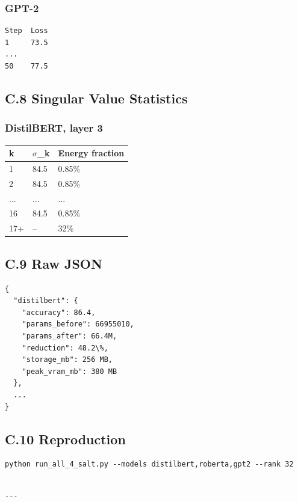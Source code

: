 \subsubsection{GPT-2}

\begin{lstlisting}
Step  Loss
1     73.5
...
50    77.5
\end{lstlisting}

\subsection{C.8 Singular Value Statistics}

\subsubsection{DistilBERT, layer 3}

\begin{table}[H]
\centering
\small
\begin{tabular}{lll}
\toprule
\textbf{k} & \textbf{$\sigma$\_k} & \textbf{Energy fraction} \\
\midrule
1 & 84.5 & 0.85\% \\
2 & 84.5 & 0.85\% \\
... & ... & ... \\
16 & 84.5 & 0.85\% \\
17+ & -- & 32\% \\
\bottomrule
\end{tabular}
\end{table}

\subsection{C.9 Raw JSON}

\begin{lstlisting}
{
  "distilbert": {
    "accuracy": 86.4,
    "params_before": 66955010,
    "params_after": 66.4M,
    "reduction": 48.2\%,
    "storage_mb": 256 MB,
    "peak_vram_mb": 380 MB
  },
  ...
}
\end{lstlisting}

\subsection{C.10 Reproduction}

\begin{lstlisting}
python run_all_4_salt.py --models distilbert,roberta,gpt2 --rank 32
\end{lstlisting}
\begin{lstlisting}

---
\end{lstlisting}


